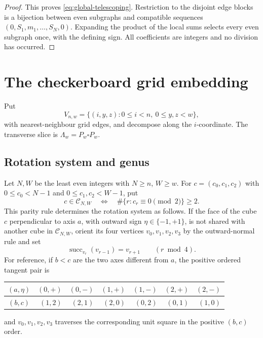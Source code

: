 \documentclass[11pt]{article}
\begin{document}
\begin{proof}
This proves \eqref{eq:global-telescoping}.  Restriction to the disjoint edge
blocks is a bijection between even subgraphs and compatible sequences
\((0,S_1,m_1,\ldots,S_N,0)\).  Expanding the product of the local sums selects
every even subgraph once, with the defining sign.  All coefficients are
integers and no division has occurred.
\end{proof}

\section{The checkerboard grid embedding}

Put
\[
 V_{n,w}=\{(i,y,z):0\leq i<n,\ 0\leq y,z<w\},
\]
with nearest-neighbour grid edges, and decompose along the \(i\)-coordinate.
The transverse slice is
\(\Lambda_w=P_w\square P_w\).

\subsection{Rotation system and genus}

Let \(N,W\) be the least even integers with \(N\geq n\), \(W\geq w\).
For \(c=(c_0,c_1,c_2)\) with
\(0\le c_0<N-1\) and \(0\le c_1,c_2<W-1\), put
\begin{equation}\label{eq:cube-set}
 c\in\mathcal C_{N,W}\quad\Longleftrightarrow\quad
 \#\{r:c_r\equiv0\pmod2\}\ge2.
\end{equation}
This parity rule determines the rotation system as follows.  If the face of
the cube \(c\) perpendicular to axis \(a\), with outward sign
\(\eta\in\{-1,+1\}\), is not shared with another cube in
\(\mathcal C_{N,W}\), orient its four vertices
\(v_0,v_1,v_2,v_3\) by the outward-normal rule and set
\begin{equation}\label{eq:successor}
 \operatorname{succ}_{v_r}(v_{r-1})=v_{r+1}\qquad(r\bmod4).
\end{equation}
For reference, if \(b<c\) are the two axes different from \(a\), the positive
ordered tangent pair is
\begin{center}
\begin{tabular}{c|rrrrrr}
\((a,\eta)\)&\((0,+)\)&\((0,-)\)&\((1,+)\)&\((1,-)\)&\((2,+)\)&\((2,-)\)\\
\midrule
\((b,c)\)&\((1,2)\)&\((2,1)\)&\((2,0)\)&\((0,2)\)&\((0,1)\)&\((1,0)\)
\end{tabular}
\end{center}
and \(v_0,v_1,v_2,v_3\) traverses the corresponding unit square in the
positive \((b,c)\) order.
\end{document}
